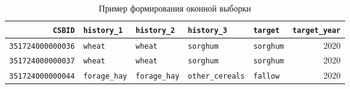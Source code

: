 \begin{table}[H]
\centering
\small
\caption{Пример формирования оконной выборки}
\label{tab:window-dataset-example}
\begin{tabular}{rllllr}
\toprule
\texttt{CSBID} &
\texttt{history\_1} &
\texttt{history\_2} &
\texttt{history\_3} &
\texttt{target} &
\texttt{target\_year} \\
\midrule
\texttt{351724000000036} & \texttt{wheat} & \texttt{wheat} & \texttt{sorghum} & \texttt{sorghum} & 2020 \\
\texttt{351724000000037} & \texttt{wheat} & \texttt{wheat} & \texttt{sorghum} & \texttt{sorghum} & 2020 \\
\texttt{351724000000044} & \texttt{forage\_hay} & \texttt{forage\_hay} & \texttt{other\_cereals} & \texttt{fallow} & 2020 \\
\bottomrule
\end{tabular}
\end{table}